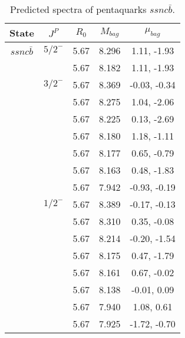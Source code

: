 \documentclass[prd,twocolumn,floatfix,nofootinbib]{revtex4}
\begin{document}
\renewcommand{\tabcolsep}{0.5cm}
\renewcommand{\arraystretch}{1.2}
\begin{table*}[!htbp]
    \caption{Predicted spectra of pentaquarks $ssnc\bar{b}$.}
    \begin{tabular}{ccccc}
        \hline\hline
        {\rm State} &$J^{P}$ &$R_{0}$ &$M_{bag}$ &$\mu_{bag}$ \\ \hline
        $ssnc\bar{b}$
            &${5/2}^{-}$    &5.67  &8.296  &1.11, -1.93\\
            &               &5.67   &8.182 &1.11, -1.93  \\
            &${3/2}^{-}$    &5.67   &8.369 &-0.03, -0.34  \\
            &               &5.67   &8.275 &1.04, -2.06  \\
            &               &5.67   &8.225 &0.13, -2.69  \\
            &               &5.67   &8.180 &1.18, -1.11  \\
            &               &5.67   &8.177 &0.65, -0.79  \\
            &               &5.67   &8.163 &0.48, -1.83  \\
            &               &5.67   &7.942 &-0.93, -0.19  \\
            &${1/2}^{-}$    &5.67   &8.389 &-0.17, -0.13  \\
            &               &5.67   &8.310 &0.35, -0.08  \\
            &               &5.67   &8.214 &-0.20, -1.54  \\
            &               &5.67   &8.175 &0.47, -1.79  \\
            &               &5.67   &8.161 &0.67, -0.02  \\
            &               &5.67   &8.138 &-0.01, 0.09  \\
            &               &5.67   &7.940 &1.08, 0.61  \\
            &               &5.67   &7.925 &-1.72, -0.70  \\
        \hline\hline
    \end{tabular}
\end{table*}
\end{document}
